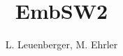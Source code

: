 \documentclass[titlepage=true]{scrartcl}
\title{EmbSW2}
\author{L. Leuenberger, M. Ehrler}
\begin{document}
\begin{titlepage}
   \thispagestyle{empty}
   \maketitle
\end{titlepage}

\lstset{style=Csharp}



\tableofcontents \newpage









\end{document}
